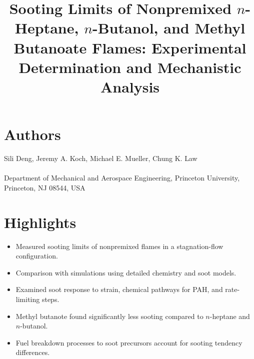 \documentclass{article}
\title{Sooting Limits of Nonpremixed $n$-Heptane, $n$-Butanol, and Methyl Butanoate Flames: Experimental Determination and Mechanistic Analysis}
\date{}
\begin{document}
\maketitle

\section*{Authors}
Sili Deng, Jeremy A. Koch, Michael E. Mueller, Chung K. Law\\ \\
Department of Mechanical and Aerospace Engineering, Princeton University,
Princeton, NJ 08544, USA

\section*{Highlights}

\begin{itemize}

\item Measured sooting limits of nonpremixed flames in a stagnation-flow configuration.
\item Comparison with simulations using detailed chemistry and soot models.
\item Examined soot response to strain, chemical pathways for PAH, and rate-limiting steps.
\item Methyl butanote found significantly less sooting compared to $n$-heptane and $n$-butanol.
\item Fuel breakdown processes to soot precursors account for sooting tendency differences.

\end{itemize}
\end{document}
